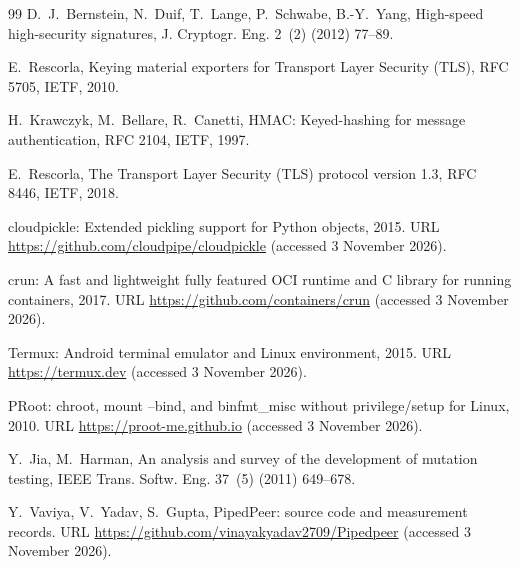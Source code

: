 \documentclass[5p,times,twocolumn]{elsarticle}
\begin{document}
\begin{thebibliography}{99}
 D.~J.~Bernstein, N.~Duif, T.~Lange, P.~Schwabe, B.-Y.~Yang, High-speed high-security signatures, J. Cryptogr. Eng. 2~(2) (2012) 77--89.

 E.~Rescorla, Keying material exporters for Transport Layer Security (TLS), RFC 5705, IETF, 2010.

 H.~Krawczyk, M.~Bellare, R.~Canetti, HMAC: Keyed-hashing for message authentication, RFC 2104, IETF, 1997.

 E.~Rescorla, The Transport Layer Security (TLS) protocol version 1.3, RFC 8446, IETF, 2018.

 cloudpickle: Extended pickling support for Python objects, 2015. URL \url{https://github.com/cloudpipe/cloudpickle} (accessed 3 November 2026).

 crun: A fast and lightweight fully featured OCI runtime and C library for running containers, 2017. URL \url{https://github.com/containers/crun} (accessed 3 November 2026).

 Termux: Android terminal emulator and Linux environment, 2015. URL \url{https://termux.dev} (accessed 3 November 2026).

 PRoot: chroot, mount --bind, and binfmt\_misc without privilege/setup for Linux, 2010. URL \url{https://proot-me.github.io} (accessed 3 November 2026).

 Y.~Jia, M.~Harman, An analysis and survey of the development of mutation testing, IEEE Trans. Softw. Eng. 37~(5) (2011) 649--678.

 Y.~Vaviya, V.~Yadav, S.~Gupta, PipedPeer: source code and measurement records. URL \url{https://github.com/vinayakyadav2709/Pipedpeer} (accessed 3 November 2026).

\end{thebibliography}
\end{document}
